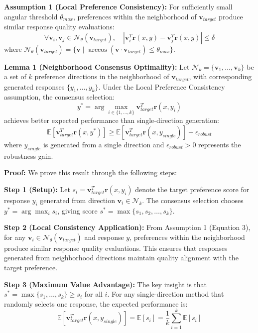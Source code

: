 \documentclass{article} %
\begin{document}
\textbf{Assumption 1 (Local Preference Consistency):} For sufficiently small angular threshold $\theta_{max}$, preferences within the neighborhood of $\mathbf{v}_{target}$ produce similar response quality evaluations:
\begin{equation}
\forall \mathbf{v}_i, \mathbf{v}_j \in \mathcal{N}_\theta(\mathbf{v}_{target}), \quad |\mathbf{v}_i^T \mathbf{r}(x,y) - \mathbf{v}_j^T \mathbf{r}(x,y)| \leq \delta
\end{equation}
where $\mathcal{N}_\theta(\mathbf{v}_{target}) = \{\mathbf{v} \mid \arccos(\mathbf{v} \cdot \mathbf{v}_{target}) \leq \theta_{max}\}$.

\textbf{Lemma 1 (Neighborhood Consensus Optimality):} Let $\mathcal{N}_k = \{\mathbf{v}_1, \ldots, \mathbf{v}_k\}$ be a set of $k$ preference directions in the neighborhood of $\mathbf{v}_{target}$, with corresponding generated responses $\{y_1, \ldots, y_k\}$. Under the Local Preference Consistency assumption, the consensus selection:
\begin{equation}
y^* = \arg\max_{i \in \{1,\ldots,k\}} \mathbf{v}_{target}^T \mathbf{r}(x, y_i)
\end{equation}
achieves better expected performance than single-direction generation:
\begin{equation}
\mathbb{E}[\mathbf{v}_{target}^T \mathbf{r}(x, y^*)] \geq \mathbb{E}[\mathbf{v}_{target}^T \mathbf{r}(x, y_{single})] + \epsilon_{robust}
\end{equation}
where $y_{single}$ is generated from a single direction and $\epsilon_{robust} > 0$ represents the robustness gain.

\textbf{Proof:} We prove this result through the following steps:

\textbf{Step 1 (Setup):} Let $s_i = \mathbf{v}_{target}^T \mathbf{r}(x, y_i)$ denote the target preference score for response $y_i$ generated from direction $\mathbf{v}_i \in \mathcal{N}_k$. The consensus selection chooses $y^* = \arg\max_i s_i$, giving score $s^* = \max\{s_1, s_2, \ldots, s_k\}$.

\textbf{Step 2 (Local Consistency Application):} From Assumption 1 (Equation 3), for any $\mathbf{v}_i \in \mathcal{N}_\theta(\mathbf{v}_{target})$ and response $y$, preferences within the neighborhood produce similar response quality evaluations. This ensures that responses generated from neighborhood directions maintain quality alignment with the target preference.

\textbf{Step 3 (Maximum Value Advantage):} The key insight is that $s^* = \max\{s_1, \ldots, s_k\} \geq s_i$ for all $i$. For any single-direction method that randomly selects one response, the expected performance is:
\begin{equation}
\mathbb{E}[\mathbf{v}_{target}^T \mathbf{r}(x, y_{single})] = \mathbb{E}[s_i] = \frac{1}{k}\sum_{i=1}^k \mathbb{E}[s_i]
\end{equation}
\end{document}
